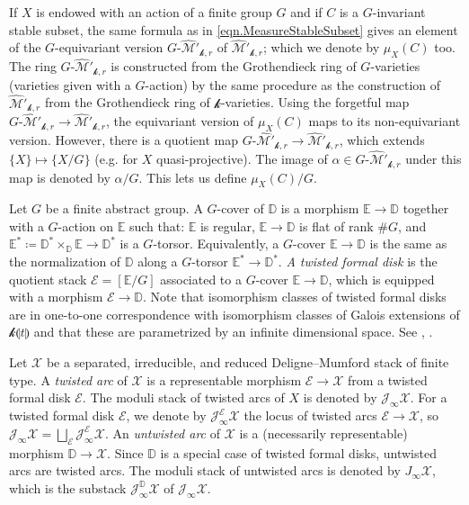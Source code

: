 \documentclass[12pt]{amsart}
\theoremstyle{plain}   %
\theoremstyle{definition}    %
\theoremstyle{remark}    %
\numberwithin{equation}{theorem}
\newcommand{\kay}{\mathcal{k}}
\newcommand{\sE}{\mathcal{E}}
\newcommand{\sJ}{\mathcal{J}}
\newcommand{\sM}{\mathcal{M}}
\newcommand{\sX}{\mathcal{X}}
\newcommand{\bD}{\mathbb{D}}
\newcommand{\bE}{\mathbb{E}}
\begin{document}
If $X$ is endowed with an action of a finite group $G$ and if $C$ is a $G$-invariant stable subset, the same formula as in \autoref{eqn.MeasureStableSubset} gives an element of the $G$-equivariant version $G\textrm{-}\hat{\sM}'_{\kay,r}$ of $\hat{\sM}'_{\kay,r}$; which we denote by $\mu_X(C)$ too.
The ring $G\textrm{-}\hat{\sM}'_{\kay,r}$ is constructed from the Grothendieck ring of $G$-varieties (varieties given with a $G$-action) by the same procedure as the construction of $\hat{\sM}'_{\kay,r}$ from the Grothendieck ring of $\kay$-varieties. Using the forgetful map $G\textrm{-}\hat{\sM}'_{\kay,r} \to \hat{\sM}'_{\kay,r}$, the equivariant version of $\mu_X(C)$ maps to its non-equivariant version. However, there is a quotient map $G\textrm{-}\hat{\sM}'_{\kay,r} \to \hat{\sM}'_{\kay,r}$, which extends $\{X\} \mapsto \{X/G\}$ (e.g. for $X$ quasi-projective). The image of $\alpha \in G\textrm{-}\hat{\sM}'_{\kay,r}$ under this map is denoted by $\alpha/G$. This lets us define $\mu_X(C)/G$.


Let $G$ be a finite abstract group. A $G$-cover of $\bD$ is a morphism $\bE \to \bD$ together with a $G$-action on $\bE$ such that: $\bE$ is regular, $\bE\to \bD$ is flat of rank $\# G$, and 
$\bE^* \coloneqq \bD^* \times_\bD \bE \to \bD^*$ is a $G$-torsor. Equivalently, a $G$-cover $\bE\to\bD$ is the same as the normalization of $\bD$ along a $G$-torsor $\bE^{\ast} \to \bD^{\ast}$. \emph{A twisted formal disk} is the quotient stack $\sE=[\bE/G]$ associated to a $G$-cover $\bE\to \bD$, which is equipped with a morphism $\sE \to \bD$. 
Note that isomorphism classes of twisted formal disks are in one-to-one correspondence with isomorphism classes of Galois extensions of $\kay \llparenthesis t \rrparenthesis$ and that these are parametrized by an infinite dimensional space. See \cite[\S2.1]{YasudaPcyclicMackayCorrespondenceMotivicIntegration}, \cite[\S5]{YasudaMotivicIntegrationDeligneMumfordStack}.

Let $\sX$ be a separated, irreducible, and reduced Deligne--Mumford stack of finite type. A \emph{twisted arc} of $\sX$ is a representable morphism $\sE \to \sX$ from a twisted formal disk $\sE$. The moduli stack of twisted arcs of $X$ is denoted by $\sJ_{\infty} \sX$. For a twisted formal disk $\sE$, we denote by $\sJ^\sE_{\infty} \sX$ the locus of twisted arcs $\sE \to \sX$, so $\sJ _{\infty}\sX =\bigsqcup _{\sE} \sJ_{\infty}^\sE \sX$. An \emph{untwisted arc} of $\sX$ is a (necessarily representable) morphism $\bD \to \sX$. Since $\bD$ is a special case of twisted formal disks, untwisted arcs are twisted arcs. The moduli stack of untwisted arcs is denoted by $J_{\infty} \sX$, which is the substack $\sJ^\bD_{\infty}\sX$ of $\sJ_{\infty} \sX$. 
\end{document}

